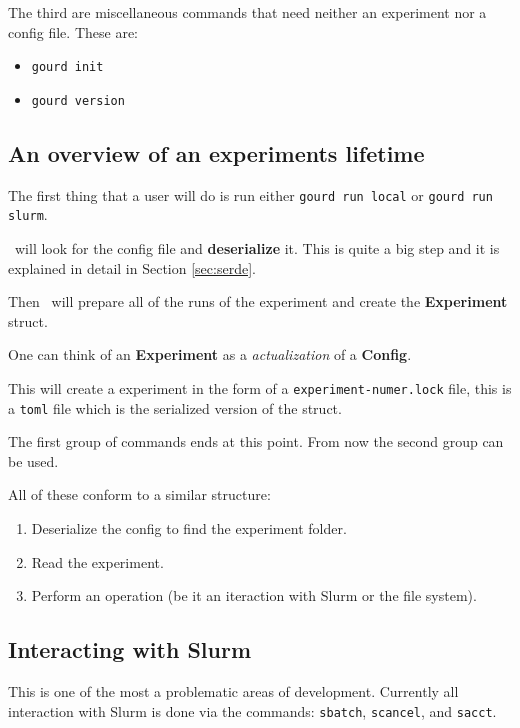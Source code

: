 The third are miscellaneous commands that need neither an experiment
nor a config file. These are:

\begin{itemize}
  \item \texttt{gourd init}
  \item \texttt{gourd version}
\end{itemize}

\subsection{An overview of an experiments lifetime}

The first thing that a user will do is run either \texttt{gourd run local}
or \texttt{gourd run slurm}.

\gourd\ will look for the config file and \textbf{deserialize} it.
This is quite a big step and it is explained in detail in Section \ref{sec:serde}.

Then \gourd\ will prepare all of the runs of the experiment and create the
\textbf{Experiment} struct.

One can think of an \textbf{Experiment} as a \emph{actualization} of a \textbf{Config}.

This will create a experiment in the form of a \texttt{experiment-numer.lock}
file, this is a \texttt{toml} file which is the serialized version of the struct.

The first group of commands ends at this point. From now the second group can be used.

All of these conform to a similar structure:

\begin{enumerate}
  \item Deserialize the config to find the experiment folder.
  \item Read the experiment.
  \item Perform an operation (be it an iteraction with Slurm or the file system).
\end{enumerate}

\subsection{Interacting with Slurm}

This is one of the most a problematic areas of development.
Currently all interaction with Slurm is done via the commands:
\texttt{sbatch}, \texttt{scancel}, and \texttt{sacct}.

